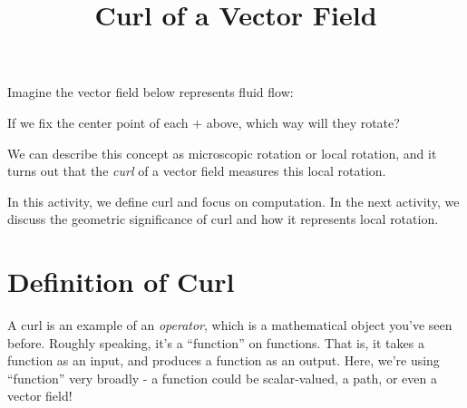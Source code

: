 \documentclass{ximera}
\title{Curl of a Vector Field}
\begin{document}
  
\begin{abstract}  
\end{abstract}  
\maketitle 


Imagine the vector field below represents fluid flow:




If we fix the center point of each $+$ above, which way will they rotate? 

We can describe this concept as microscopic rotation or local rotation, and it turns out that the \emph{curl} of a vector field measures this local rotation.

In this activity, we define curl and focus on computation. In the next activity, we discuss the geometric significance of curl and how it represents local rotation.

\section{Definition of Curl}

A curl is an example of an \emph{operator}, which is a mathematical object you've seen before. Roughly speaking, it's a ``function'' on functions. That is, it takes a function as an input, and produces a function as an output. Here, we're using ``function'' very broadly - a function could be scalar-valued, a path, or even a vector field!
\end{document}

